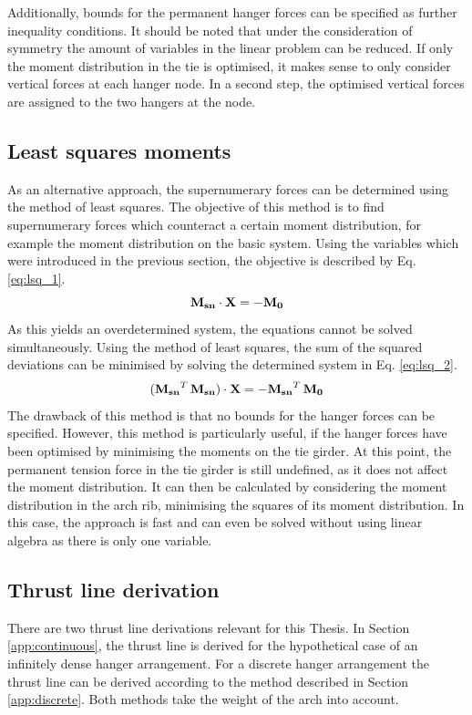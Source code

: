 Additionally, bounds for the permanent hanger forces can be specified as further inequality conditions. It should be noted that under the consideration of symmetry the amount of variables in the linear problem can be reduced. If only the moment distribution in the tie is optimised, it makes sense to only consider vertical forces at each hanger node. In a second step, the optimised vertical forces are assigned to the two hangers at the node.

\subsection{Least squares moments} \label{app:lsq}
As an alternative approach, the supernumerary forces can be determined using the method of least squares. The objective of this method is to find supernumerary forces which counteract a certain moment distribution, for example the moment distribution on the basic system. Using the variables which were introduced in the previous section, the objective is described by Eq. \eqref{eq:lsq_1}.
\begin{equation}
    {\bf M_{sn}} \cdot {\bf X} = -{\bf M_0}
    \label{eq:lsq_1}
\end{equation}
As this yields an overdetermined system, the equations cannot be solved simultaneously. Using the method of least squares, the sum of the squared deviations can be minimised by solving the determined system in Eq. \eqref{eq:lsq_2}.
\begin{equation}
    ({\bf M_{sn}}^T\,{\bf M_{sn}}) \cdot {\bf X} = -{\bf M_{sn}}^T\,{\bf M_0}
    \label{eq:lsq_2}
\end{equation}
The drawback of this method is that no bounds for the hanger forces can be specified. However, this method is particularly useful, if the hanger forces have been optimised by minimising the moments on the tie girder. At this point, the permanent tension force in the tie girder is still undefined, as it does not affect the moment distribution. It can then be calculated by considering the moment distribution in the arch rib, minimising the squares of its moment distribution. In this case, the approach is fast and can even be solved without using linear algebra as there is only one variable.

\subsection{Thrust line derivation} \label{app:thrust_line}
There are two thrust line derivations relevant for this Thesis. In Section \ref{app:continuous}, the thrust line is derived for the hypothetical case of an infinitely dense hanger arrangement. For a discrete hanger arrangement the thrust line can be derived according to the method described in Section \ref{app:discrete}. Both methods take the weight of the arch into account.

